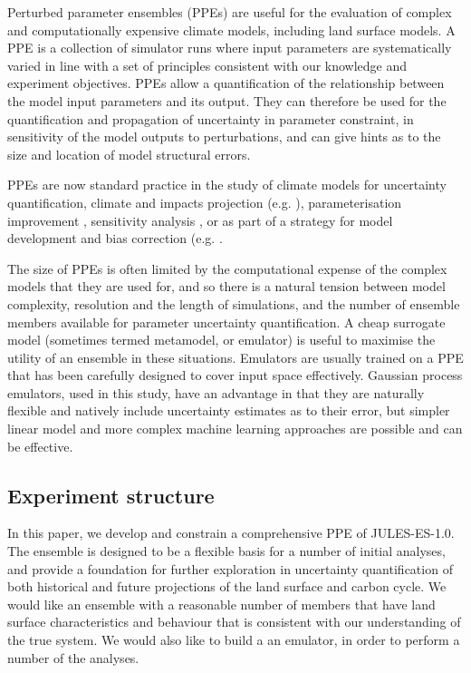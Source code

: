 \documentclass[gmd, manuscript]{copernicus}
\begin{document}
Perturbed parameter ensembles (PPEs) are useful for the evaluation of complex and computationally expensive climate models, including land surface models. A PPE is a collection of simulator runs where input parameters are systematically varied in line with a set of principles consistent with our knowledge and experiment objectives. PPEs allow a quantification of the relationship between the model input parameters and its output. They can therefore be used for the quantification and propagation of uncertainty in parameter constraint, in sensitivity of the model outputs to perturbations, and can give hints as to the size and location of model structural errors.

PPEs are now standard practice in the study of climate models for uncertainty quantification, climate and impacts projection (e.g. \cite{sexton2021perturbed, edwards2019revisiting}), parameterisation improvement \citep{couvreux2021process}, sensitivity analysis \citep{carslaw2013large}, or as part of a strategy for model development and bias correction (e.g. \cite{williamson2015identifying,mcneall2016impact, mcneall2020correcting, hourdin2017art}.

The size of PPEs is often limited by the computational expense of the complex models that they are used for, and so there is a natural tension between model complexity, resolution and the length of simulations, and the number of ensemble members available for parameter uncertainty quantification. A cheap surrogate model (sometimes termed metamodel, or emulator) is useful to maximise the utility of an ensemble in these situations. Emulators are usually trained on a PPE that has been carefully designed to cover input space effectively. Gaussian process emulators, used in this study, have an advantage in that they are naturally flexible and natively include uncertainty estimates as to their error, but simpler linear model and more complex machine learning approaches are possible and can be effective.

\subsection{Experiment structure}\label{ssec:experiment_structure}

In this paper, we develop and constrain a comprehensive PPE of JULES-ES-1.0. The ensemble is designed to be a flexible basis for a number of initial analyses, and provide a foundation for further exploration in uncertainty quantification of both historical and future projections of the land surface and carbon cycle.  We would like an ensemble with a reasonable number of members that have land surface characteristics and behaviour that is consistent with our understanding of the true system. We would also like to build a an emulator, in order to perform a number of the analyses.
\end{document}

